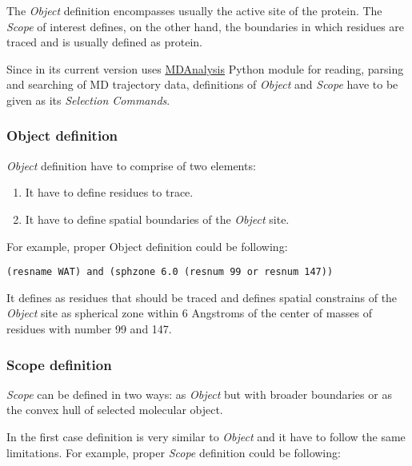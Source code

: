 \documentclass[a4paper,10pt,english]{sphinxmanual}
\begin{document}
The \emph{Object} definition encompasses usually the active site of the protein. The \emph{Scope} of interest defines, on the other hand, the boundaries in which residues are traced and is usually defined as protein.

Since {\hyperref[aqueduct:module-aqueduct]{}} in its current version uses \href{http://www.mdanalysis.org/}{MDAnalysis} Python module for reading, parsing and searching of MD trajectory data, definitions of \emph{Object} and \emph{Scope} have to be given as its \emph{Selection Commands}.


\subsubsection{Object definition}
\label{valve/valve_manual:object-definition}\label{valve/valve_manual:id1}
\emph{Object} definition have to comprise of two elements:
\begin{enumerate}
\item {} 
It have to define residues to trace.

\item {} 
It have to define spatial boundaries of the \emph{Object} site.

\end{enumerate}

For example, proper Object definition could be following:

\begin{Verbatim}[commandchars=\\\{\}]
(resname WAT) and (sphzone 6.0 (resnum 99 or resnum 147))
\end{Verbatim}

It defines  as residues that should be traced and defines spatial constrains of the \emph{Object} site as spherical zone within 6 Angstroms of the center of masses of residues with number 99 and 147.


\subsubsection{Scope definition}
\label{valve/valve_manual:scope-definition}\label{valve/valve_manual:id2}
\emph{Scope} can be defined in two ways: as \emph{Object} but with broader boundaries or as the convex hull of selected molecular object.

In the first case definition is very similar to \emph{Object} and it have to follow the same limitations. For example, proper \emph{Scope} definition could be following:
\end{document}
